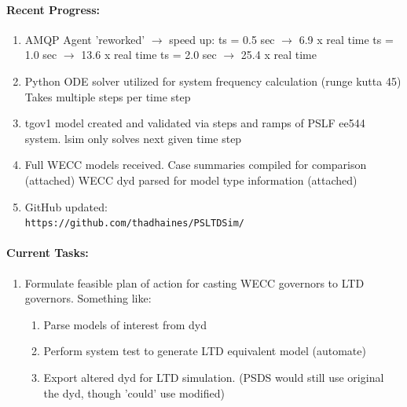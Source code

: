 \documentclass[12pt]{article}
\begin{document}
\begin{multicols}{2}

	\paragraph{Recent Progress:}
	\begin{enumerate}
		\item AMQP Agent 'reworked' $\rightarrow$ speed up:
		\subitem ts = 0.5 sec $\rightarrow$ 6.9 x  real time
		\subitem ts = 1.0 sec $\rightarrow$ 13.6 x real time 
		\subitem ts = 2.0 sec $\rightarrow$ 25.4 x real time 
		
		\item Python ODE solver utilized for system frequency calculation (runge kutta 45)
		\subitem Takes multiple steps per time step

		\item tgov1 model created and validated via steps and ramps of PSLF ee544 system.
		\subitem lsim only solves next given time step
		
		\item Full WECC models received.
		\subitem Case summaries compiled for comparison (attached)
		\subitem WECC dyd parsed for model type information (attached)
		

		\item GitHub updated:\\
		\verb|https://github.com/thadhaines/PSLTDSim/|
		
	\end{enumerate}
\paragraph{Current Tasks:}
	\begin{enumerate}
		\item Formulate feasible plan of action for casting WECC governors to LTD governors. Something like:
		\begin{enumerate}
		\item Parse models of interest from dyd
		\item Perform system test to generate LTD equivalent model (automate)
		\item Export altered dyd for LTD simulation. (PSDS would still use original the dyd, though 'could' use modified)
		\end{enumerate}
		

\end{enumerate}
\end{multicols}
\end{document}
